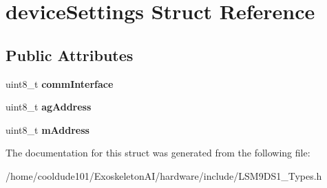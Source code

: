 \hypertarget{structdeviceSettings}{}\section{device\+Settings Struct Reference}
\label{structdeviceSettings}
\subsection*{Public Attributes}
\begin{DoxyCompactItemize}
\item 
uint8\+\_\+t {\bfseries comm\+Interface}\hypertarget{structdeviceSettings_a6512c63d06cce5f99760b1b3a6a4dfe9}{}\label{structdeviceSettings_a6512c63d06cce5f99760b1b3a6a4dfe9}

\item 
uint8\+\_\+t {\bfseries ag\+Address}\hypertarget{structdeviceSettings_a2f43ac785e01fcbcfaf8436885f638ab}{}\label{structdeviceSettings_a2f43ac785e01fcbcfaf8436885f638ab}

\item 
uint8\+\_\+t {\bfseries m\+Address}\hypertarget{structdeviceSettings_aec4e1d3e3f38b4e3e0f74f1640e16faa}{}\label{structdeviceSettings_aec4e1d3e3f38b4e3e0f74f1640e16faa}

\end{DoxyCompactItemize}


The documentation for this struct was generated from the following file\+:\begin{DoxyCompactItemize}
\item 
/home/cooldude101/\+Exoskeleton\+A\+I/hardware/include/L\+S\+M9\+D\+S1\+\_\+\+Types.\+h\end{DoxyCompactItemize}
